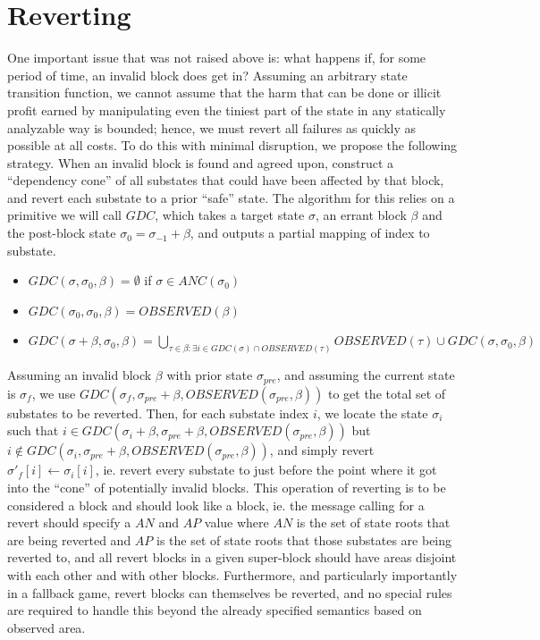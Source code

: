 \documentclass[11pt,a4paper]{report}
\theoremstyle{plain}
\theoremstyle{definition}
\theoremstyle{remark}
\begin{document}
\chapter{Reverting}

One important issue that was not raised above is: what happens if, for some period of time, an invalid block does get in? Assuming an arbitrary state transition function, we cannot assume that the harm that can be done or illicit profit earned by manipulating even the tiniest part of the state in any statically analyzable way is bounded; hence, we must revert all failures as quickly as possible at all costs. To do this with minimal disruption, we propose the following strategy. When an invalid block is found and agreed upon, construct a ``dependency cone'' of all substates that could have been affected by that block, and revert each substate to a prior ``safe'' state. The algorithm for this relies on a primitive we will call $GDC$, which takes a target state $\sigma$, an errant block $\beta$ and the post-block state $\sigma_0 = \sigma_{-1} + \beta$, and outputs a partial mapping of index to substate.

\begin{itemize}
\item
$GDC(\sigma, \sigma_0, \beta) = \emptyset$ if $\sigma \in ANC(\sigma_0)$
\item
$GDC(\sigma_0, \sigma_0, \beta) = OBSERVED(\beta)$
\item
$GDC(\sigma + \beta, \sigma_0, \beta) = \bigcup_{\tau \in \beta: \exists i \in GDC(\sigma) \cap OBSERVED(\tau)} OBSERVED(\tau) \cup GDC(\sigma, \sigma_0, \beta)$
\end{itemize}

Assuming an invalid block $\beta$ with prior state $\sigma_{pre}$, and assuming the current state is $\sigma_f$, we use $GDC(\sigma_f, \sigma_{pre} + \beta, OBSERVED(\sigma_{pre}, \beta))$ to get the total set of substates to be reverted. Then, for each substate index $i$, we locate the state $\sigma_i$ such that $i \in GDC(\sigma_i + \beta, \sigma_{pre} + \beta, OBSERVED(\sigma_{pre}, \beta))$ but $i \notin GDC(\sigma_i, \sigma_{pre} + \beta, OBSERVED(\sigma_{pre}, \beta))$, and simply revert $\sigma'_f[i] \leftarrow \sigma_i[i]$, ie. revert every substate to just before the point where it got into the ``cone'' of potentially invalid blocks. This operation of reverting is to be considered a block and should look like a block, ie. the message calling for a revert should specify a $AN$ and $AP$ value where $AN$ is the set of state roots that are being reverted and $AP$ is the set of state roots that those substates are being reverted to, and all revert blocks in a given super-block should have areas disjoint with each other and with other blocks. Furthermore, and particularly importantly in a fallback game, revert blocks can themselves be reverted, and no special rules are required to handle this beyond the already specified semantics based on observed area.
\end{document}
